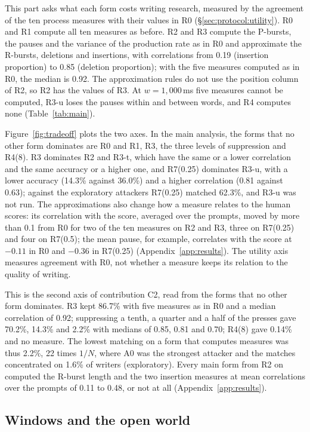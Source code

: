 This part asks what each form costs writing research, measured by the agreement of the ten process measures with
their values in R0 (\S\ref{sec:protocol:utility}). R0 and R1 compute all ten measures as before. R2 and R3 compute the
P-bursts, the pauses and the variance of the production rate as in R0 and approximate the R-bursts, deletions and
insertions, with correlations from 0.19 (insertion proportion) to 0.85 (deletion proportion); with the five measures
computed as in R0, the median is 0.92. The approximation rules do not use the position column of R2, so R2 has the
values of R3. At $w = 1{,}000$\,ms five measures cannot be computed,
R3-u loses the pauses within and between words, and R4 computes none (Table~\ref{tab:main}).

Figure~\ref{fig:tradeoff} plots the two axes. In the main analysis, the forms that no other form dominates are R0 and R1, R3, the three
levels of suppression and R4(8). R3 dominates R2 and R3-t, which have the same or a lower correlation and the same
accuracy or a higher one, and R7(0.25) dominates R3-u, with a lower accuracy (14.3\% against 36.0\%) and a higher
correlation (0.81 against 0.63); against the exploratory attackers R7(0.25) matched 62.3\%, and R3-u was not run.
The approximations also change how a measure relates to the human scores: its correlation with the score, averaged
over the prompts, moved by more than 0.1 from R0 for two of the ten measures on R2 and R3, three on R7(0.25) and four on
R7(0.5); the mean pause, for example, correlates with the score at $-0.11$ in R0 and $-0.36$ in R7(0.25)
(Appendix~\ref{app:results}). The utility axis
measures agreement with R0, not whether a measure keeps its relation to the quality of writing.

This is the second axis of contribution C2, read from the forms that no other form dominates. R3 kept 86.7\% with
five measures as in R0 and a median correlation of 0.92; suppressing a tenth, a quarter and a half of the presses gave
70.2\%, 14.3\% and 2.2\% with medians of 0.85, 0.81 and 0.70; R4(8) gave 0.14\% and no measure. The lowest
matching on a form that computes measures was thus 2.2\%, 22 times $1/N$, where A0 was the strongest attacker and the
matches concentrated on 1.6\% of writers (exploratory). Every
main form from R2 on computed the R-burst length and the two insertion measures at mean correlations over the prompts
of 0.11 to 0.48, or not at all (Appendix~\ref{app:results}).

\subsection{Windows and the open world}
\label{sec:results:windows}

